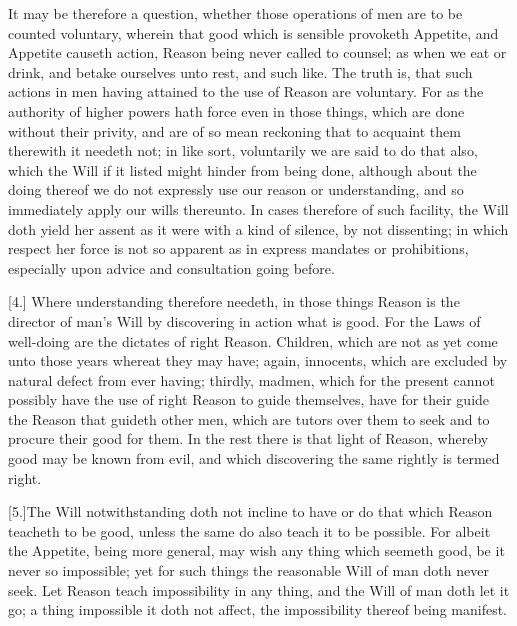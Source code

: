It may be therefore a question, whether those operations of men are to be counted voluntary, wherein that good which is sensible provoketh Appetite, and Appetite causeth action, Reason being never called to counsel; as when we eat or drink, and betake ourselves unto rest, and such like. The truth is, that such actions in men having attained to the use of Reason are voluntary. For as the authority of higher powers hath force even in those things, which are done without their privity, and are of so mean reckoning that to acquaint them therewith it needeth not; in like sort, voluntarily we are said to do that also, which the Will if it listed might hinder from being done, although about the doing thereof we do not expressly use our reason or understanding, and so immediately apply our wills thereunto. In cases therefore of such facility, the Will doth yield her assent as it were with a kind of silence, by not dissenting; in which respect her force is not so apparent as in express mandates or prohibitions, especially upon advice and consultation going before.


[4.] Where understanding therefore needeth, in those things Reason is the director of man’s Will by discovering in action what is good. For the Laws of well-doing are the dictates of right Reason. Children, which are not as yet come unto those years whereat they may have; again, innocents, which are excluded by natural defect from ever having; thirdly, madmen, which for the present cannot possibly have the use of right Reason to guide themselves, have for their guide the Reason that guideth other men, which are tutors over them to seek and to procure their good for them. In the rest there is that light of Reason, whereby good may be known from evil, and which discovering the same rightly is termed right.

[5.]The Will notwithstanding doth not incline to have or do that which Reason teacheth to be good, unless the same do also teach it to be possible. For albeit the Appetite, being more general, may wish any thing which seemeth good, be it never so impossible; yet for such things the reasonable Will of man doth never seek. Let Reason teach impossibility in any thing, and the Will of man doth let it go; a thing impossible it doth not affect, the impossibility thereof being manifest.

